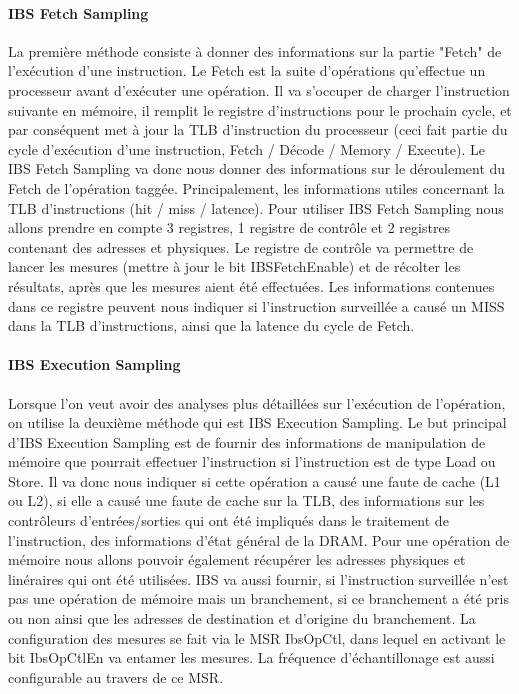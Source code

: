			\eitem

			\paragraph{IBS Fetch Sampling}
			La première méthode consiste à donner des informations sur la partie "Fetch" de l'exécution d'une instruction. Le Fetch est la suite d'opérations qu'effectue un processeur avant d'exécuter une opération. Il va s'occuper de charger l'instruction suivante en mémoire, il remplit le registre d'instructions pour le prochain cycle, et par conséquent met à jour la TLB d'instruction du processeur (ceci fait partie du cycle d'exécution d'une instruction, Fetch / Décode / Memory / Execute). Le IBS Fetch Sampling va donc nous donner des informations sur le déroulement du Fetch de l'opération taggée. Principalement, les informations utiles concernant la TLB d'instructions (hit / miss / latence). Pour utiliser IBS Fetch Sampling nous allons prendre en compte 3 registres, 1 registre de contrôle et 2 registres contenant des adresses et physiques. Le registre de contrôle va permettre de lancer les mesures (mettre à jour le bit IBSFetchEnable) et de récolter les résultats, après que les mesures aient été effectuées. Les informations contenues dans ce registre peuvent nous indiquer si l'instruction surveillée a causé un MISS dans la TLB d'instructions, ainsi que la latence du cycle de Fetch.\\
			\paragraph{IBS Execution Sampling}
			Lorsque l'on veut avoir des analyses plus détaillées sur l'exécution de l'opération, on utilise la deuxième méthode qui est IBS Execution Sampling. Le but principal d'IBS Execution Sampling est de fournir des informations de manipulation de mémoire que pourrait effectuer l'instruction si l'instruction est de type Load ou Store. Il va donc nous indiquer si cette opération a causé une faute de cache (L1 ou L2), si elle a causé une faute de cache sur la TLB, des informations sur les contrôleurs d'entrées/sorties qui ont été impliqués dans le traitement de l'instruction, des informations d'état général de la DRAM. Pour une opération de mémoire nous allons pouvoir également récupérer les adresses physiques et linéraires qui ont été utilisées. IBS va aussi fournir, si l'instruction surveillée n'est pas une opération de mémoire mais un branchement, si ce branchement a été pris ou non ainsi que les adresses de destination et d'origine du branchement. La configuration des mesures se fait via le MSR IbsOpCtl, dans lequel en activant le bit IbsOpCtlEn va entamer les mesures. La fréquence d'échantillonage est aussi configurable au travers de ce MSR. 
